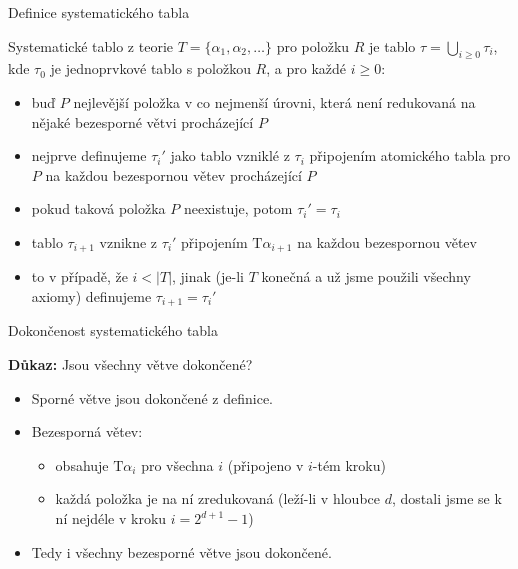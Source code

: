 \documentclass{beamer}
\begin{document}
\begin{frame}{Definice systematického tabla}
 
    \alert{Systematické tablo} z teorie $T=\{\alpha_1,\alpha_2,\dots\}$ pro položku $R$ je tablo $\tau=\bigcup_{i\geq 0}\tau_i$, kde $\tau_0$ je jednoprvkové tablo s položkou $R$, a pro každé $i\geq 0$:

    \begin{itemize}
        \item buď $P$ nejlevější položka v co nejmenší úrovni, která není redukovaná na nějaké bezesporné větvi procházející $P$
        \item nejprve definujeme $\tau_i'$ jako tablo vzniklé z $\tau_i$ připojením atomického tabla pro $P$ na každou bezespornou větev procházející $P$
        \item pokud taková položka $P$ neexistuje, potom $\tau_i'=\tau_i$
        \item tablo $\tau_{i+1}$ vznikne z $\tau_i'$ připojením $\mathrm{T}\alpha_{i+1}$ na každou bezespornou větev
        \item to v případě, že $i<|T|$, jinak (je-li $T$ konečná a už jsme použili všechny axiomy) definujeme $\tau_{i+1}=\tau_i'$
    \end{itemize}  

\end{frame}


\begin{frame}{Dokončenost systematického tabla}


    \textbf{Důkaz:} 
    Jsou všechny větve dokončené?

    \begin{itemize}
        \item Sporné větve jsou dokončené z definice.
        \item Bezesporná větev:
        \begin{itemize}
            \item \alert{obsahuje $\mathrm{T}\alpha_i$} pro všechna $i$ (připojeno v $i$-tém kroku)
            \item každá položka je na ní \alert{zredukovaná} (leží-li v hloubce $d$, dostali jsme se k ní nejdéle v kroku $i=2^{d+1}-1$)
        \end{itemize}  
        \item Tedy i všechny bezesporné větve jsou dokončené.\hfill\qedsymbol        
    \end{itemize}  

\end{frame}
\end{document}
